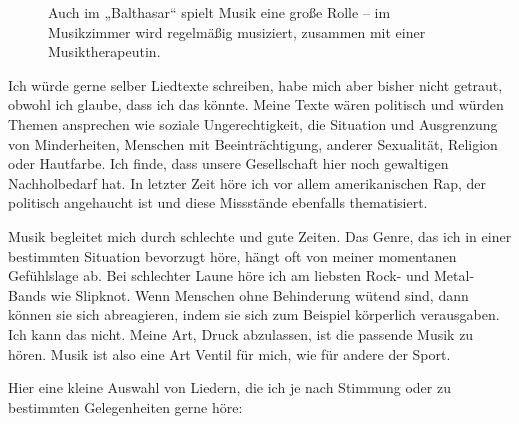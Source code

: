\documentclass[fontsize=14pt,a4paper,headinclude,DIV=calc,automark]{scrbook}
\begin{document}
\setlength{\fboxsep}{0pt}    %
\setlength{\fboxrule}{0.2pt} %
\begin{figure}[ht]
    \raggedright
    \caption{Auch im „Balthasar“ spielt Musik eine große Rolle – im Musikzimmer wird regelmäßig musiziert, zusammen mit einer Musiktherapeutin.}
    \label{fig:musikzimmer}
\end{figure}

Ich würde gerne selber Liedtexte schreiben, habe mich aber bisher nicht getraut, obwohl ich glaube, dass ich das könnte. Meine Texte wären politisch und würden Themen ansprechen wie soziale Ungerechtigkeit, die Situation und Ausgrenzung von Minderheiten, Menschen mit Beeinträchtigung, anderer Sexualität, Religion oder Hautfarbe. Ich finde, dass unsere Gesellschaft hier noch gewaltigen Nachholbedarf hat. In letzter Zeit höre ich vor allem amerikanischen Rap, der politisch angehaucht ist und diese Missstände ebenfalls thematisiert.

Musik begleitet mich durch schlechte und gute Zeiten. Das Genre, das ich in einer bestimmten Situation bevorzugt höre, hängt oft von meiner momentanen Gefühlslage ab. Bei schlechter Laune höre ich am liebsten Rock- und Metal-Bands wie Slipknot. Wenn Menschen ohne Behinderung wütend sind, dann können sie sich abreagieren, indem sie sich zum Beispiel körperlich verausgaben. Ich kann das nicht. Meine Art, Druck abzulassen, ist die passende Musik zu hören. Musik ist also eine Art Ventil für mich, wie für andere der Sport.

Hier eine kleine Auswahl von Liedern, die ich je nach Stimmung oder zu bestimmten Gelegenheiten gerne höre:
\end{document}
